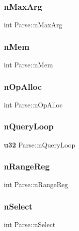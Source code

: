 \mbox{\label{struct_parse_aab781bff62f93c0f9a7ca979a3b3a820}} 
\subsubsection{nMaxArg}
{\footnotesize\ttfamily int Parse\+::n\+Max\+Arg}

\mbox{\label{struct_parse_aa66b48b0ababc17403615c899cddec9c}} 
\subsubsection{nMem}
{\footnotesize\ttfamily int Parse\+::n\+Mem}

\mbox{\label{struct_parse_a84dadce444e15f0584fa2a35a4e5eadf}} 
\subsubsection{nOpAlloc}
{\footnotesize\ttfamily int Parse\+::n\+Op\+Alloc}

\mbox{\label{struct_parse_ae85aa19104aeeab3cc7241bfd8b5d553}} 
\subsubsection{nQueryLoop}
{\footnotesize\ttfamily \textbf{ u32} Parse\+::n\+Query\+Loop}

\mbox{\label{struct_parse_ae32922d3d20171f4acc426714b497e6f}} 
\subsubsection{nRangeReg}
{\footnotesize\ttfamily int Parse\+::n\+Range\+Reg}

\mbox{\label{struct_parse_ac1bec2d3dffc86e3b404e11c77724b6d}} 
\subsubsection{nSelect}
{\footnotesize\ttfamily int Parse\+::n\+Select}

\mbox{\label{struct_parse_a6b3a46e1f275962fa8808dddba20ba23}} 
